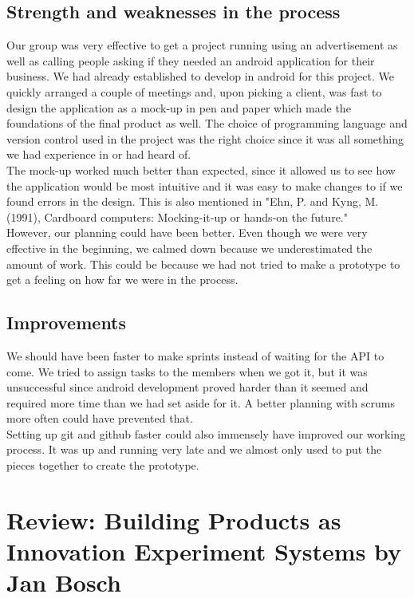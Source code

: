\documentclass[12pt]{article}
\begin{document}
\subsection{Strength and weaknesses in the process}
Our group was very effective to get a project running using an advertisement as well as calling people asking if they needed an android application for their business. We had already established to develop in android for this project. We quickly arranged a couple of meetings and, upon picking a client, was fast to design the application as a mock-up in pen and paper which made the foundations of the final product as well. The choice of programming language and version control used in the project was the right choice since it was all something we had experience in or had heard of.\\
The mock-up worked much better than expected, since it allowed us to see how the application would be most intuitive and it was easy to make changes to if we found errors in the design. This is also mentioned in "Ehn, P. and Kyng, M. (1991), Cardboard computers: Mocking-it-up or hands-on the future."\\
However, our planning could have been better. Even though we were very effective in the beginning, we calmed down because we underestimated the amount of work. This could be because we had not tried to make a prototype to get a feeling on how far we were in the process.

\subsection{Improvements}
We should have been faster to make sprints instead of waiting for the API to come. We tried to assign tasks to the members when we got it, but it was unsuccessful since android development proved harder than it seemed and required more time than we had set aside for it. A better planning with scrums more often could have prevented that.\\
Setting up git and github faster could also immensely have improved our working process. It was up and running very late and we almost only used to put the pieces together to create the prototype.

\newpage
\section{Review: Building Products as Innovation Experiment Systems by Jan Bosch}
\end{document}
